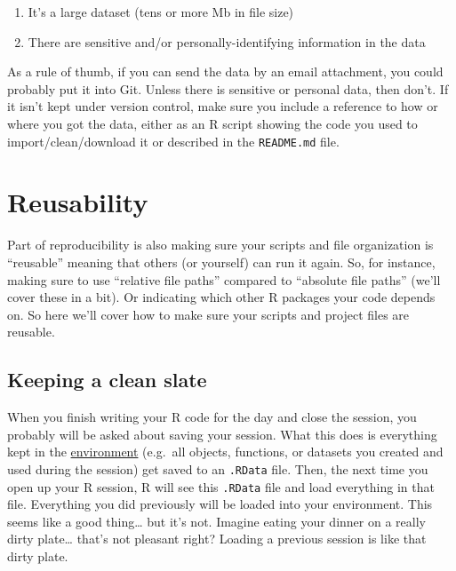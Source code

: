 \documentclass[]{Nemilov}
\providecommand{\tightlist}{%
  \setlength{\itemsep}{0pt}\setlength{\parskip}{0pt}}
\begin{document}
\begin{enumerate}
\def\labelenumi{\arabic{enumi}.}
\tightlist
\item
  It's a large dataset (tens or more Mb in file size)
\item
  There are sensitive and/or personally-identifying information in the data
\end{enumerate}

As a rule of thumb, if you can send the data by an email attachment, you could
probably put it into Git. Unless there is sensitive or personal data, then don't.
If it isn't kept under version control, make sure you include a reference to how
or where you got the data, either as an R script showing the code you used to
import/clean/download it or described in the \texttt{README.md} file.

\hypertarget{r-reproducibility-reusability}{%
\section{Reusability}\label{r-reproducibility-reusability}}

Part of reproducibility is also making sure your scripts and file organization is
``reusable'' meaning that others (or yourself) can run it again. So, for instance,
making sure to use ``relative file paths'' compared to ``absolute file paths''
(we'll cover these in a bit). Or indicating which other R packages your code
depends on. So here we'll cover how to make sure your scripts and project files
are reusable.

\hypertarget{keeping-a-clean-slate}{%
\subsection{Keeping a clean slate}\label{keeping-a-clean-slate}}

When you finish writing your R code for the day and close the session, you probably
will be asked about saving your session. What this does is everything kept in the
\href{glossary.html\#environment}{environment} (e.g.~all objects, functions, or datasets you created and used
during the session) get saved to an \texttt{.RData} file. Then, the next time you open up
your R session, R will see this \texttt{.RData} file and load everything in that file.
Everything you did previously will be loaded into your environment. This seems like
a good thing\ldots{} but it's not. Imagine eating your dinner on a really dirty plate\ldots{}
that's not pleasant right? Loading a previous session is like that dirty plate.
\end{document}
